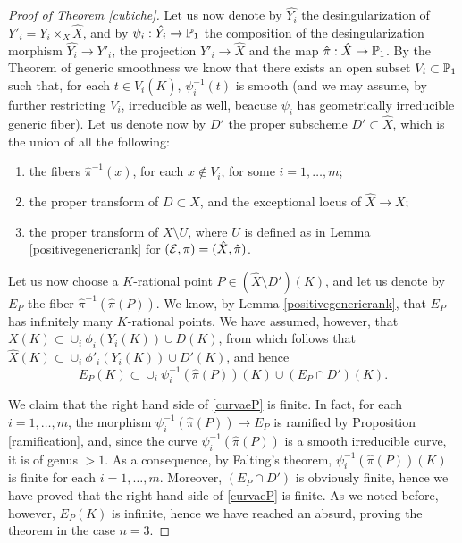 \documentclass[a4paper,12pt]{article}
\begin{document}
\begin{proof}[Proof of Theorem \ref{cubiche}]
	Let us now denote by $\hat{Y_i}$ the desingularization of $Y'_i=Y_i \times_X \hat{X}$, and by $\psi_i:\hat{Y_i}\rightarrow \P_1$  the composition of the desingularization morphism $\hat{Y_i} \rightarrow Y'_i$, the projection $Y'_i \rightarrow \hat{X}$ and the map $\hat{\pi}:\hat{X} \rightarrow \P_1$. By the Theorem of generic smoothness \cite[Corollary 10.7]{hartshorne} we know that there exists an open subset $V_i \subset \P_1$ such that, for each $t \in V_i(\overline{K})$, $\psi_i^{-1}(t)$ is smooth (and we may assume, by further restricting $V_i$, irreducible as well, beacuse $\psi_i$ has geometrically irreducible generic fiber). Let us denote now by $D'$ the proper subscheme $D' \subset \hat{X}$, which is the union of all the following:
	\begin{enumerate}
		\item the fibers $\hat{\pi}^{-1}(x)$, for each $x \notin V_i$, for some $i=1, \dots, m$;
		\item the proper transform of $D \subset X$, and the exceptional locus of $\hat{X}\rightarrow X$;
		\item the proper transform of $X \setminus U$, where $U$ is defined as in Lemma \ref{positivegenericrank} for $(\Eps,\pi)=(\hat{X},\hat{\pi})$. 
	\end{enumerate}
	Let us now choose a $K$-rational point $P \in (\hat{X}\setminus D')(K)$, and let us denote by $E_P$ the fiber $\hat{\pi}^{-1}(\hat{\pi}(P))$. We know, by Lemma \ref{positivegenericrank}, that $E_P$ has infinitely many $K$-rational points. We have assumed, however, that  $X(K) \subset \cup_i \phi_i(Y_i(K)) \cup D(K)$, from which follows that  $\hat{X}(K) \subset \cup_i \phi'_i(Y_i(K)) \cup D'(K)$, and hence 
	\begin{equation}\label{curvaeP}
	E_P(K) \subset \cup_i \psi_i^{-1}(\hat{\pi}(P))(K) \cup (E_P\cap D')(K). 
	\end{equation}

	We claim that the right hand side of \ref{curvaeP} is finite. In fact, for each $i=1,\dots, m $, the morphism $\psi_i^{-1}(\hat{\pi}(P)) \rightarrow E_P$ is ramified by Proposition \ref{ramification}, and, since the curve $\psi_i^{-1}(\hat{\pi}(P))$ is a smooth irreducible curve, it is of genus $>1$. As a consequence, by Falting's theorem, $\psi_i^{-1}(\hat{\pi}(P))(K)$ is finite for each $i=1,\dots, m$. Moreover, $(E_P\cap D')$ is obviously finite, hence we have proved that the right hand side of \ref{curvaeP} is finite. As we noted before, however, $E_P(K)$ is infinite, hence we have reached an absurd, proving the theorem in the case $n=3$.
	

\end{proof}
\end{document}
